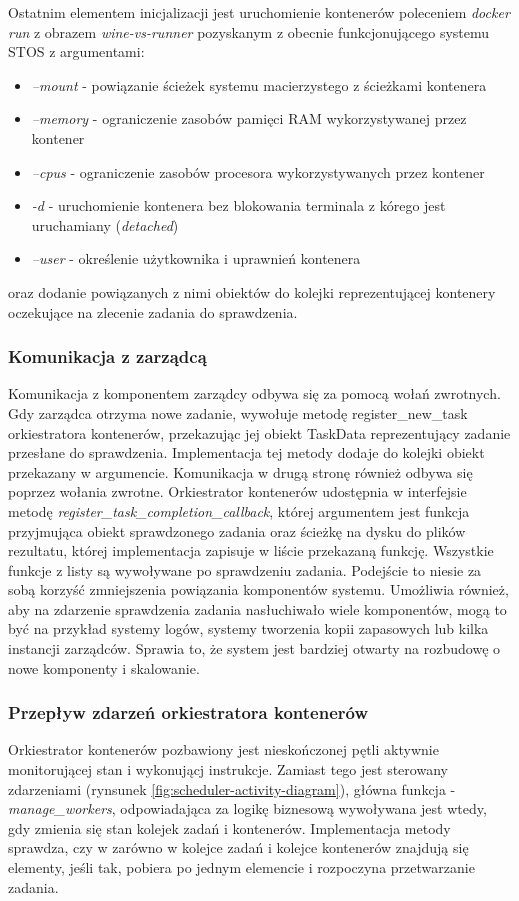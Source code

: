 Ostatnim elementem inicjalizacji jest uruchomienie kontenerów poleceniem \textit{docker run} z obrazem \textit{wine-vs-runner} pozyskanym z obecnie funkcjonującego systemu STOS z argumentami:
\begin{itemize}
    \item \textit{--mount} - powiązanie ścieżek systemu macierzystego z ścieżkami kontenera
    \item \textit{--memory} - ograniczenie zasobów pamięci RAM wykorzystywanej przez kontener
    \item \textit{--cpus} - ograniczenie zasobów procesora wykorzystywanych przez kontener
    \item \textit{-d} - uruchomienie kontenera bez blokowania terminala z kórego jest uruchamiany (\textit{detached})
    \item \textit{--user} - określenie użytkownika i uprawnień kontenera
\end{itemize}
oraz dodanie powiązanych z nimi obiektów do kolejki reprezentującej kontenery oczekujące na zlecenie zadania do sprawdzenia.

\subsubsection{Komunikacja z zarządcą}
Komunikacja z komponentem zarządcy odbywa się za pomocą wołań zwrotnych. Gdy zarządca otrzyma nowe zadanie, wywołuje metodę register\_new\_task orkiestratora kontenerów, przekazując jej obiekt TaskData reprezentujący zadanie przesłane do sprawdzenia. Implementacja tej metody dodaje do kolejki obiekt przekazany w argumencie. Komunikacja w drugą stronę również odbywa się poprzez wołania zwrotne. Orkiestrator kontenerów udostępnia w interfejsie metodę \textit{register\_task\_completion\_callback}, której argumentem jest funkcja przyjmująca obiekt sprawdzonego zadania oraz ścieżkę na dysku do plików rezultatu, której implementacja zapisuje w liście przekazaną funkcję. Wszystkie funkcje z listy są wywoływane po sprawdzeniu zadania. Podejście to niesie za sobą korzyść zmniejszenia powiązania komponentów systemu. Umożliwia również, aby na zdarzenie sprawdzenia zadania nasłuchiwało wiele komponentów, mogą to być na przykład systemy logów, systemy tworzenia kopii zapasowych lub kilka instancji zarządców. Sprawia to, że system jest bardziej otwarty na rozbudowę o nowe komponenty i skalowanie.

\subsubsection{Przepływ zdarzeń orkiestratora kontenerów}
Orkiestrator kontenerów pozbawiony jest nieskończonej pętli aktywnie monitorującej stan i wykonującj instrukcje. Zamiast tego jest sterowany zdarzeniami (rynsunek \ref{fig:scheduler-activity-diagram}), główna funkcja - \textit{manage\_workers}, odpowiadająca za logikę biznesową wywoływana jest wtedy, gdy zmienia się stan kolejek zadań i kontenerów. Implementacja metody sprawdza, czy w zarówno w kolejce zadań i kolejce kontenerów znajdują się elementy, jeśli tak, pobiera po jednym elemencie i rozpoczyna przetwarzanie zadania.

